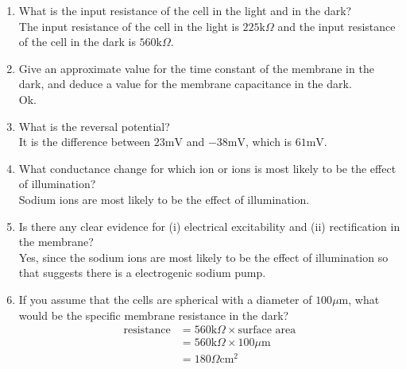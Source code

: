 \documentclass[11pt]{article}
\begin{document}
\begin{enumerate}[label=\arabic*.]
\begin{enumerate}[label=(\alph*)]
\item
What is the input resistance of the cell in the light and in the dark?
\vspace*{1\baselineskip}
\\
The input resistance of the cell in the light is $225 \text{k}\Omega$ and the input resistance of the cell in the dark is $560 \text{k}\Omega$.



\item
Give an approximate value for the time constant of the membrane in the dark, and deduce a value for the membrane capacitance in the dark.
\vspace*{1\baselineskip}
\\
Ok.



\item
What is the reversal potential?
\vspace*{1\baselineskip}
\\
It is the difference between $23 \text{mV}$ and $-38 \text{mV}$, which is $61 \text{mV}$.



\item
What conductance change for which ion or ions is most likely to be the effect of illumination?
\vspace*{1\baselineskip}
\\
Sodium ions are most likely to be the effect of illumination.



\item
Is there any clear evidence for (i) electrical excitability and (ii) rectification in the membrane?
\vspace*{1\baselineskip}
\\
Yes, since the sodium ions are most likely to be the effect of illumination so that suggests there is a electrogenic sodium pump.



\item
If you assume that the cells are spherical with a diameter of $100 \mu\text{m}$, what would be the specific membrane resistance in the dark?
\begin{align*}
\text{resistance} &= 560 \text{k}\Omega \times \text{surface area} \\
 &= 560 \text{k}\Omega \times 100 \mu\text{m} \\
 &= 180 \Omega \text{cm}^2
\end{align*}




\end{enumerate}
\end{enumerate}
\end{document}
